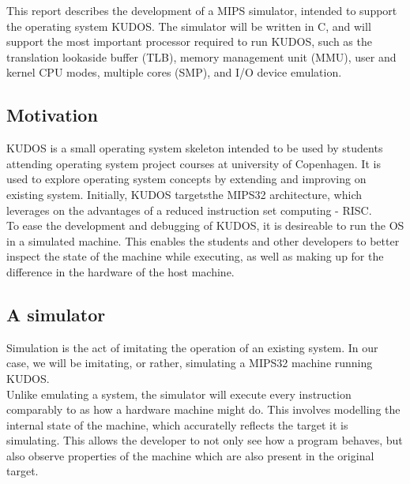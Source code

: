 This report describes the development of a MIPS simulator, intended to support
the operating system KUDOS. The simulator will be written in C, and will
support the most important processor required to run KUDOS, such as the
translation lookaside
buffer (TLB), memory management unit (MMU), user and kernel CPU modes,
multiple cores (SMP), and I/O device emulation. \\


\subsection{Motivation}
KUDOS is a small operating system skeleton intended to be used by students
attending operating system project courses at university of Copenhagen.
It is used to explore operating system concepts by extending and improving on
existing system.
Initially, KUDOS targetsthe MIPS32 architecture, which leverages on the
advantages of a
reduced instruction set computing - RISC.\\
To ease the development and debugging of KUDOS, it is desireable to run the OS
in a simulated machine. This enables the students and other developers to
better inspect the state of the machine while executing, as well as making up
for the difference in the hardware of the host machine.

\subsection{A simulator}
Simulation is the act of imitating the operation of an existing system. In our
case, we will be imitating, or rather, simulating a MIPS32 machine running
KUDOS.\\
Unlike emulating a system, the simulator will execute every instruction
comparably to as how a hardware machine might do.
This involves modelling the internal state of the machine, which accuratelly
reflects the target it is simulating.
This allows the developer to not only see how
a program behaves, but also observe properties of the machine which are also
present in the original target.
